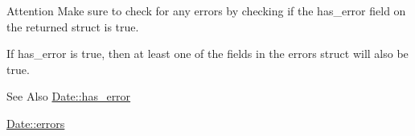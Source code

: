 \begin{DoxyAttention}{Attention}
Make sure to check for any errors by checking if the {\ttfamily has\-\_\-error} field on the returned struct is true.
\end{DoxyAttention}
If {\ttfamily has\-\_\-error} is true, then at least one of the fields in the {\ttfamily errors} struct will also be true.

\begin{DoxySeeAlso}{See Also}
\hyperlink{structDate_a4f417d9dd4cd9fd081aff88f9b13931b}{Date\-::has\-\_\-error} 

\hyperlink{structDate_a69b79f56137adf67014f4009f0047c79}{Date\-::errors} 
\end{DoxySeeAlso}
